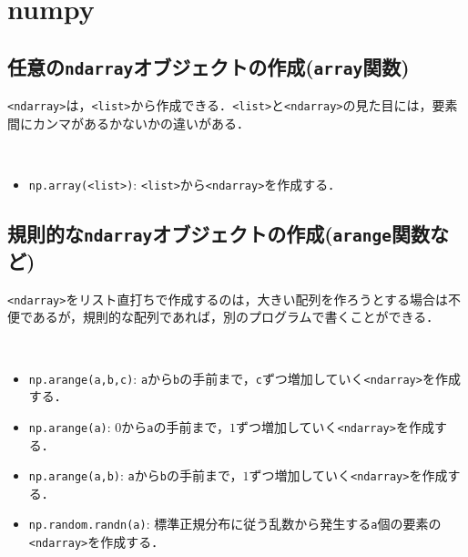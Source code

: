 \section{numpy}

\subsection{任意の\texttt{ndarray}オブジェクトの作成(\texttt{array}関数)}

\texttt{<ndarray>}は，\texttt{<list>}から作成できる．\texttt{<list>}と\texttt{<ndarray>}の見た目には，要素間にカンマがあるかないかの違いがある．

\begin{gram}　
\begin{itemize}
\item \texttt{np.array(<list>)}: \texttt{<list>}から\texttt{<ndarray>}を作成する．
\end{itemize}
\end{gram}

\begin{cod}[\texttt{num1.py}]　
}]{code/num1.py}
\vspace{-7pt}
\begin{lstlisting}
x=[1 2 3],type=<class 'numpy.ndarray'>
y=[ 4.1  5.9 -6.3  7. ],type=<class 'numpy.ndarray'>
mylist=[4.1, 5.9, -6.3, 7.0],type=<class 'list'>
\end{lstlisting}
\end{cod}
\vspace{-10pt}

\subsection{規則的な\texttt{ndarray}オブジェクトの作成(\texttt{arange}関数など)}
\texttt{<ndarray>}をリスト直打ちで作成するのは，大きい配列を作ろうとする場合は不便であるが，規則的な配列であれば，別のプログラムで書くことができる．

\begin{gram}　
\begin{itemize}
\item \texttt{np.arange(a,b,c)}: \texttt{a}から\texttt{b}の手前まで，\texttt{c}ずつ増加していく\texttt{<ndarray>}を作成する．
\item \texttt{np.arange(a)}: $0$から\texttt{a}の手前まで，$1$ずつ増加していく\texttt{<ndarray>}を作成する．
\item \texttt{np.arange(a,b)}: \texttt{a}から\texttt{b}の手前まで，$1$ずつ増加していく\texttt{<ndarray>}を作成する．
\item \texttt{np.random.randn(a)}: 標準正規分布に従う乱数から発生する\texttt{a}個の要素の\texttt{<ndarray>}を作成する．
\end{itemize}
\end{gram}


